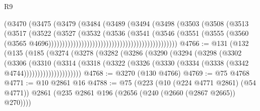 \begin{lexlean}{R9}
\begin{coremodule}
{{{{{{{{{{{{{{{{{{{{{{{{{{{{{{{{{{{{{{{{{{{{{{{{{{{{{{{{{{{{{{{{{{{{{{{{{{{{{{{{{{{{                                                        (@3470
                                                          (@3475
                                                            (@3479
                                                              (@3484
                                                                (@3489
                                                                  (@3494
                                                                    (@3498
                                                                      (@3503
                                                                        (@3508
                                                                          (@3513
                                                                            (@3517
                                                                              (@3522
                                                                                (@3527
                                                                                  (@3532
                                                                                    (@3536
                                                                                      (@3541
                                                                                        (@3546
                                                                                          (@3551
                                                                                            (@3555
                                                                                              (@3560
                                                                                                (@3565
                                                                                                  @4696)))))))))))))))))))))))))))))))))))))))))))))))
@4766 := @131
    (@132
      (@135
        (@185
          (@3274
            (@3278
              (@3282
                (@3286
                  (@3290
                    (@3294
                      (@3298
                        (@3302
                          (@3306
                            (@3310
                              (@3314
                                (@3318
                                  (@3322
                                    (@3326 (@3330 (@3334 (@3338 (@3342 @4744)))))))))))))))))))))
@4768 := @3270 (@130 @4766)
@4769 := @75 @4768
@4771 := @10 @2861 @16
@4788 := @75
    (@223
      (@10 (@224 @4771 @2861) (@54 @4771))
      @2861
      (@235 @2861 @196 (@2656 (@240 (@2660 (@2867 @2665)) @270))))
}}}}}}}}}}}}}}}}}}}}}}}}}}}}}}}}}}}}}}}}}}}}}}}}}}}}}}}}}}}}}}}}}}}}}}}}}}}}}}}}}}}}
\end{coremodule}
\end{lexlean}
